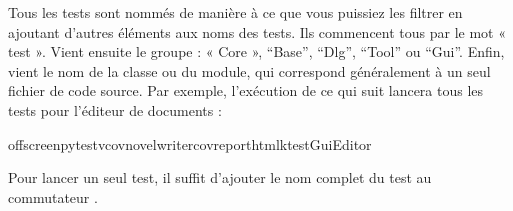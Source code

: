 \documentclass[a4paper,11pt,french]{sphinxmanual}
\begin{document}
\sphinxAtStartPar
Tous les tests sont nommés de manière à ce que vous puissiez les filtrer en ajoutant d’autres éléments aux noms des tests. Ils commencent tous par le mot « test ». Vient ensuite le groupe : « Core », “Base”, “Dlg”, “Tool” ou “Gui”. Enfin, vient le nom de la classe ou du module, qui correspond généralement à un seul fichier de code source. Par exemple, l’exécution de ce qui suit lancera tous les tests pour l’éditeur de documents :

\begin{sphinxVerbatim}[commandchars=\\\{\}]
offscreenpytest\PYGZhy{}v\PYGZhy{}\PYGZhy{}covnovelwriter\PYGZhy{}\PYGZhy{}cov\PYGZhy{}reporthtml\PYGZhy{}ktestGuiEditor
\end{sphinxVerbatim}

\sphinxAtStartPar
Pour lancer un seul test, il suffit d’ajouter le nom complet du test au commutateur .



\renewcommand{\indexname}{Index}
\printindex
\end{document}
